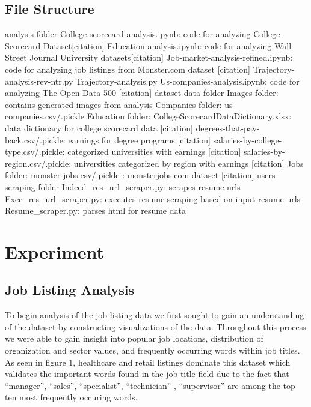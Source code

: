 \subsection{File Structure}
analysis folder
College-scorecard-analysis.ipynb: code for analyzing College Scorecard Dataset[citation]
Education-analysis.ipynb: code for analyzing Wall Street Journal University datasets[citation]
Job-market-analysis-refined.ipynb: code for analyzing job listings from Monster.com dataset [citation]
Trajectory-analysis-rev-ntr.py
Trajectory-analysis.py
Us-companies-analysis.ipynb: code for analyzing The Open Data 500 [citation] dataset
data folder
Images folder: contains generated images from analysis
Companies folder: 
us-companies.csv/.pickle
Education folder:
CollegeScorecardDataDictionary.xlsx: data dictionary for college scorecard data [citation]
degrees-that-pay-back.csv/.pickle: earnings for degree programs [citation]
salaries-by-college-type.csv/.pickle: categorized universities with earnings [citation]
salaries-by-region.csv/.pickle: universities categorized by region with earnings [citation]
Jobs folder:
monster-jobs.csv/.pickle : monsterjobs.com dataset [citation]
users
scraping folder
Indeed_res_url_scraper.py: scrapes resume urls
Exec_res_url_scraper.py: executes resume scraping based on input resume urls
Resume_scraper.py: parses html for resume data

\section{Experiment}
\subsection{Job Listing Analysis}
To begin analysis of the job listing data we first sought to gain an understanding of the dataset by constructing visualizations of the data. Throughout this process we were able to gain insight into popular job locations, distribution of organization and sector values, and frequently occurring words within job titles.  As seen in figure 1, healthcare and retail listings dominate this dataset which validates the important words found in the job title field due to the fact that “manager”, “sales”, “specialist”, “technician” , “supervisor” are among the top ten most frequently occuring words. 

